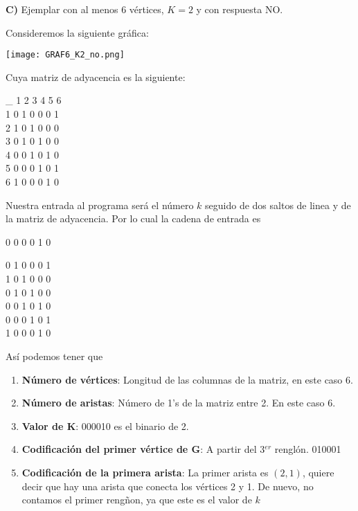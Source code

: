 \documentclass[12pt,letterpaper]{article}
\begin{document}
\newpage
\textbf{C)} Ejemplar con al menos 6 vértices, $K = 2$ y con respuesta NO.

Consideremos la siguiente gráfica: 
\begin{center}
    \texttt{[image: GRAF6\_K2\_no.png]}
\end{center}
Cuya matriz de adyacencia es la siguiente: 

\begin{center}
\_ 1 2 3 4 5 6 \\
1  0 1 0 0 0 1 \\
2  1 0 1 0 0 0 \\
3  0 1 0 1 0 0 \\
4  0 0 1 0 1 0 \\
5  0 0 0 1 0 1 \\
6  1 0 0 0 1 0 \\
\end{center}
Nuestra entrada al programa será el número $k$ seguido de dos saltos de linea y de la matriz de adyacencia. Por lo cual la cadena de entrada es
\begin{center}
0 0 0 0 1 0


0 1 0 0 0 1 \\
1 0 1 0 0 0 \\
0 1 0 1 0 0 \\
0 0 1 0 1 0 \\
0 0 0 1 0 1 \\
1 0 0 0 1 0 \\
\end{center}

Así podemos tener que

\begin{enumerate}
    \item \textbf{Número de vértices}: Longitud de las columnas de la matriz, en este caso 6.
    
    \item \textbf{Número de aristas}: Número de 1's de la matriz entre 2. En este caso 6.
    
    \item \textbf{Valor de K}: 000010 es el binario de 2.
    
    \item \textbf{Codificación del primer vértice de G}: A partir del 3$^{er}$ renglón. 010001
    
    \item \textbf{Codificación de la primera arista}: La primer arista es $(2,1)$, quiere decir que hay una arista que conecta los vértices 2 y 1. De nuevo, no contamos el primer rengñon, ya que este es el valor de $k$
\end{enumerate}
\end{document}
